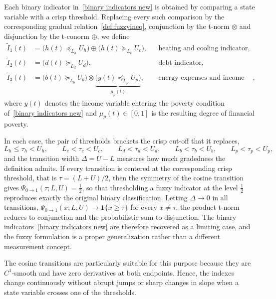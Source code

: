 \documentclass[11pt,a4paper]{article}
\begin{document}
Each binary indicator in~\eqref{binary indicators new} is obtained by comparing a state variable with a crisp threshold. Replacing every such comparison by the corresponding gradual relation~\eqref{def:fuzzyineq}, conjunction by the t-norm $\otimes$ and disjunction by the t-conorm $\oplus$, we define
\begin{align}
\widetilde{I}_1(t)
&=
\bigl(h(t)\preceq_{L_h} U_h\bigr)
\oplus
\bigl(h(t)\succeq_{L_c} U_c\bigr),
&& \text{heating and cooling indicator},
\label{eq:index-heating-cooling}
\\[0.5em]
\widetilde{I}_2(t)
&=
\bigl(d(t)\succeq_{L_d} U_d\bigr),
&& \text{debt indicator},
\label{eq:index-debt}
\\[0.5em]
\widetilde{I}_3(t)
&=
\bigl(b(t)\succeq_{L_b} U_b\bigr)
\otimes
\underbrace{\bigl(y(t)\preceq_{L_p} U_p\bigr)}_{\mu_p(t)},
&& \text{energy expenses and income indicator},
\label{eq:index-expenses-income}
\end{align}
where \(y(t)\) denotes the income variable entering the poverty condition of~\eqref{binary indicators new} and \(\mu_p(t)\in[0,1]\) is the resulting degree of financial poverty.

In each case, the pair of thresholds brackets the crisp cut-off that it replaces,
\[
L_h\le\tau_h<U_h,\qquad
L_c<\tau_c<U_c,\qquad
L_d<\tau_d<U_d,\qquad
L_b<\tau_b<U_b,\qquad
L_p<\tau_p<U_p,
\]
and the transition width \(\Delta=U-L\) measures how much gradedness the definition admits. If every transition is centered at the corresponding crisp threshold, that is \(\tau=(L+U)/2\), then the symmetry of the cosine transition gives \(\Psi_{0\to1}(\tau;L,U)=\tfrac12\), so that thresholding a fuzzy indicator at the level \(\tfrac12\) reproduces exactly the original binary classification. Letting \(\Delta\to0\) in all transitions, \(\Psi_{0\to1}(x;L,U)\to\mathbf{1}\{x\ge\tau\}\) for every \(x\neq\tau\), the product t-norm reduces to conjunction and the probabilistic sum to disjunction. The binary indicators~\eqref{binary indicators new} are therefore recovered as a limiting case, and the fuzzy formulation is a proper generalization rather than a different measurement concept.

The cosine transitions are particularly suitable for this purpose because they are \(C^1\)-smooth and have zero derivatives at both endpoints. Hence, the indexes change continuously without abrupt jumps or sharp changes in slope when a state variable crosses one of the thresholds.
\end{document}
